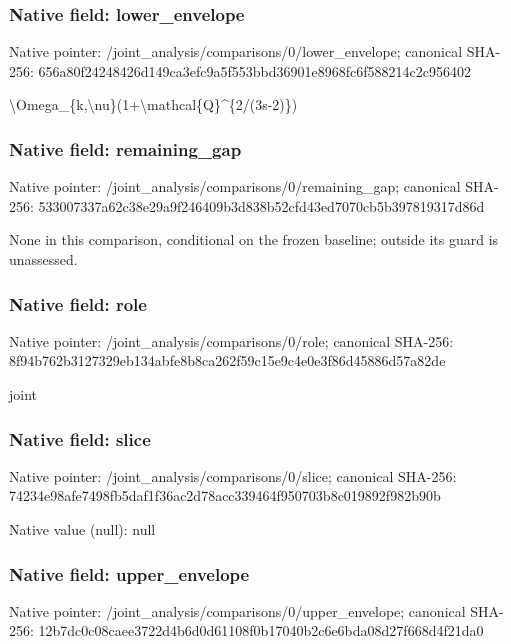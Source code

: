 \documentclass[10pt,a4paper]{article}
\begin{document}
\subsubsection{Native field: lower\_\allowbreak{}envelope}
Native pointer: /joint\_\allowbreak{}analysis/comparisons/0/lower\_\allowbreak{}envelope; canonical SHA-256: 656a80f24248426d149ca3efc9a5f553bbd36901e8968fc6f588214c2c956402

\begingroup\raggedright\sloppy \textbackslash{}Omega\_\allowbreak{}\{k,\allowbreak{}\textbackslash{}nu\}(1+\textbackslash{}mathcal\{Q\}\textasciicircum{}\{2/\allowbreak{}(3s-2)\})\par\endgroup

\subsubsection{Native field: remaining\_\allowbreak{}gap}
Native pointer: /joint\_\allowbreak{}analysis/comparisons/0/remaining\_\allowbreak{}gap; canonical SHA-256: 533007337a62c38e29a9f246409b3d838b52cfd43ed7070cb5b397819317d86d

\begingroup\raggedright\sloppy None in this comparison,\allowbreak{} conditional on the frozen baseline;\allowbreak{} outside its guard is unassessed.\par\endgroup

\subsubsection{Native field: role}
Native pointer: /joint\_\allowbreak{}analysis/comparisons/0/role; canonical SHA-256: 8f94b762b3127329eb134abfe8b8ca262f59c15e9c4e0e3f86d45886d57a82de

\begingroup\raggedright\sloppy joint\par\endgroup

\subsubsection{Native field: slice}
Native pointer: /joint\_\allowbreak{}analysis/comparisons/0/slice; canonical SHA-256: 74234e98afe7498fb5daf1f36ac2d78acc339464f950703b8c019892f982b90b

Native value (null): null

\subsubsection{Native field: upper\_\allowbreak{}envelope}
Native pointer: /joint\_\allowbreak{}analysis/comparisons/0/upper\_\allowbreak{}envelope; canonical SHA-256: 12b7dc0c08caee3722d4b6d0d61108f0b17040b2c6e6bda08d27f668d4f21da0
\end{document}
